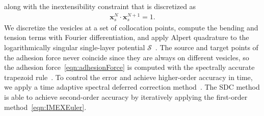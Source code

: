 \documentclass[aps,prl,twocolumn,showpacs,amsmath,amssymb]{revtex4-1}
\renewcommand{\SS}{\mathcal{S}}
\newcommand{\xx}{\mathbf{x}}
\begin{document}
along with the inextensibility constraint that is discretized as
\begin{align*}
  \xx_s^{N} \cdot \xx_{s}^{N+1} = 1.
\end{align*}
We discretize the vesicles at a set of collocation points, compute the
bending and tension terms with Fourier differentiation, and apply
Alpert quadrature to the logarithmically singular single-layer potential
$\SS$~\cite{alp1999}.  The source and target points of the adhesion
force never coincide since they are always on different vesicles, so the
adhesion force~\eqref{eqn:adhesionForce} is computed with the spectrally
accurate trapezoid rule~\cite{tre-wei2014}.  To control the error and
achieve higher-order accuracy in time, we apply a time adaptive spectral
deferred correction method~\cite{qua-bir2016}.  The SDC method is able
to achieve second-order accuracy by iteratively applying the first-order
method~\eqref{eqn:IMEXEuler}.


\end{document}
